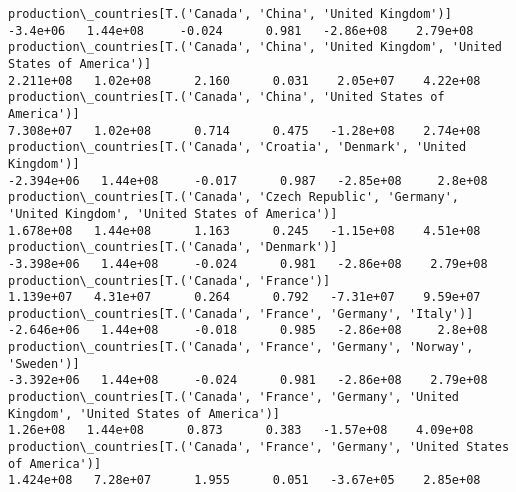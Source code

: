\documentclass[11pt]{article}
\begin{document}
\begin{Verbatim}[commandchars=\\\{\}]
production\_countries[T.('Canada', 'China', 'United Kingdom')]                                                                                                                           -3.4e+06   1.44e+08     -0.024      0.981   -2.86e+08    2.79e+08
production\_countries[T.('Canada', 'China', 'United Kingdom', 'United States of America')]                                                                                              2.211e+08   1.02e+08      2.160      0.031    2.05e+07    4.22e+08
production\_countries[T.('Canada', 'China', 'United States of America')]                                                                                                                7.308e+07   1.02e+08      0.714      0.475   -1.28e+08    2.74e+08
production\_countries[T.('Canada', 'Croatia', 'Denmark', 'United Kingdom')]                                                                                                            -2.394e+06   1.44e+08     -0.017      0.987   -2.85e+08     2.8e+08
production\_countries[T.('Canada', 'Czech Republic', 'Germany', 'United Kingdom', 'United States of America')]                                                                          1.678e+08   1.44e+08      1.163      0.245   -1.15e+08    4.51e+08
production\_countries[T.('Canada', 'Denmark')]                                                                                                                                         -3.398e+06   1.44e+08     -0.024      0.981   -2.86e+08    2.79e+08
production\_countries[T.('Canada', 'France')]                                                                                                                                           1.139e+07   4.31e+07      0.264      0.792   -7.31e+07    9.59e+07
production\_countries[T.('Canada', 'France', 'Germany', 'Italy')]                                                                                                                      -2.646e+06   1.44e+08     -0.018      0.985   -2.86e+08     2.8e+08
production\_countries[T.('Canada', 'France', 'Germany', 'Norway', 'Sweden')]                                                                                                           -3.392e+06   1.44e+08     -0.024      0.981   -2.86e+08    2.79e+08
production\_countries[T.('Canada', 'France', 'Germany', 'United Kingdom', 'United States of America')]                                                                                   1.26e+08   1.44e+08      0.873      0.383   -1.57e+08    4.09e+08
production\_countries[T.('Canada', 'France', 'Germany', 'United States of America')]                                                                                                    1.424e+08   7.28e+07      1.955      0.051   -3.67e+05    2.85e+08

\end{Verbatim}
\end{document}
